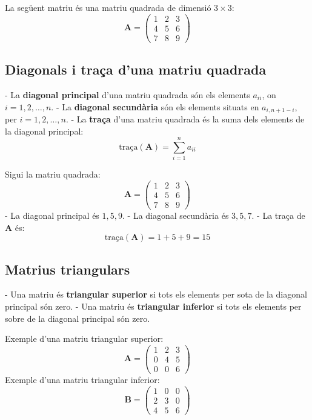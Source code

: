\documentclass[12pt]{article}
\newcommand{\mat}[1]{\mathbf{#1}}
\begin{document}
\begin{exemple}
La següent matriu és una matriu quadrada de dimensió $3 \times 3$:
\[
\mat{A} = \begin{pmatrix}
1 & 2 & 3 \\
4 & 5 & 6 \\
7 & 8 & 9
\end{pmatrix}
\]
\end{exemple}

\subsection{Diagonals i traça d'una matriu quadrada}
\begin{concept}
- La \textbf{diagonal principal} d'una matriu quadrada són els elements $a_{ii}$, on $i = 1, 2, \dots, n$.  
- La \textbf{diagonal secundària} són els elements situats en $a_{i, n+1-i}$, per $i = 1, 2, \dots, n$.  
- La \textbf{traça} d'una matriu quadrada és la suma dels elements de la diagonal principal:
\[
\text{traça}(\mat{A}) = \sum_{i=1}^n a_{ii}
\]
\end{concept}

\begin{exemple}
Sigui la matriu quadrada:
\[
\mat{A} = \begin{pmatrix}
1 & 2 & 3 \\
4 & 5 & 6 \\
7 & 8 & 9
\end{pmatrix}
\]
- La diagonal principal és $1, 5, 9$.
- La diagonal secundària és $3, 5, 7$.
- La traça de $\mat{A}$ és:
\[
\text{traça}(\mat{A}) = 1 + 5 + 9 = 15
\]
\end{exemple}

\subsection{Matrius triangulars}
\begin{concept}
- Una matriu és \textbf{triangular superior} si tots els elements per sota de la diagonal principal són zero.
- Una matriu és \textbf{triangular inferior} si tots els elements per sobre de la diagonal principal són zero.
\end{concept}

\begin{exemple}
Exemple d'una matriu triangular superior:
\[
\mat{A} = \begin{pmatrix}
1 & 2 & 3 \\
0 & 4 & 5 \\
0 & 0 & 6
\end{pmatrix}
\]
Exemple d'una matriu triangular inferior:
\[
\mat{B} = \begin{pmatrix}
1 & 0 & 0 \\
2 & 3 & 0 \\
4 & 5 & 6
\end{pmatrix}
\]
\end{exemple}
\end{document}
